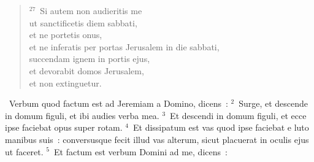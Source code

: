 \begin{flushleft}
\begin{verse}
${}^{27}$~Si autem non audieritis me\\ ut sanctificetis diem sabbati,\\ et ne portetis onus,\\ et ne inferatis per portas Jerusalem in die sabbati,\\ succendam ignem in portis ejus,\\ et devorabit domos Jerusalem,\\ et non extinguetur.\end{verse}\end{flushleft}


~\lettrine[lines=10,image=true,loversize=0.05,lraise=-0.03]{V}{}erbum quod factum est ad Jeremiam a Domino, dicens~:
${}^{2}$~Surge, et descende in domum figuli, et ibi audies verba mea.
${}^{3}$~Et descendi in domum figuli, et ecce ipse faciebat opus super rotam.
${}^{4}$~Et dissipatum est vas quod ipse faciebat e luto manibus suis~: conversusque fecit illud vas alterum, sicut placuerat in oculis ejus ut faceret.
${}^{5}$~Et factum est verbum Domini ad me, dicens~:
